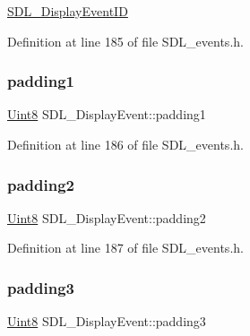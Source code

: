 \mbox{\hyperlink{_s_d_l__video_8h_ad671b39d95c255af51db93cb54512ffc}{S\+D\+L\+\_\+\+Display\+Event\+ID}} 

Definition at line 185 of file S\+D\+L\+\_\+events.\+h.

\mbox{\label{struct_s_d_l___display_event_a8a6937d7483828f3b9ac68fb79963e33}} 
\subsubsection{\texorpdfstring{padding1}{padding1}}
{\footnotesize\ttfamily \mbox{\hyperlink{_s_d_l__stdinc_8h_a2944638813a090aa23e62f4da842c3e2}{Uint8}} S\+D\+L\+\_\+\+Display\+Event\+::padding1}



Definition at line 186 of file S\+D\+L\+\_\+events.\+h.

\mbox{\label{struct_s_d_l___display_event_afe4ffe1364f1a29457636c8b74c7a3ce}} 
\subsubsection{\texorpdfstring{padding2}{padding2}}
{\footnotesize\ttfamily \mbox{\hyperlink{_s_d_l__stdinc_8h_a2944638813a090aa23e62f4da842c3e2}{Uint8}} S\+D\+L\+\_\+\+Display\+Event\+::padding2}



Definition at line 187 of file S\+D\+L\+\_\+events.\+h.

\mbox{\label{struct_s_d_l___display_event_aa4de9fba8f58fedb949894741ab0552b}} 
\subsubsection{\texorpdfstring{padding3}{padding3}}
{\footnotesize\ttfamily \mbox{\hyperlink{_s_d_l__stdinc_8h_a2944638813a090aa23e62f4da842c3e2}{Uint8}} S\+D\+L\+\_\+\+Display\+Event\+::padding3}



